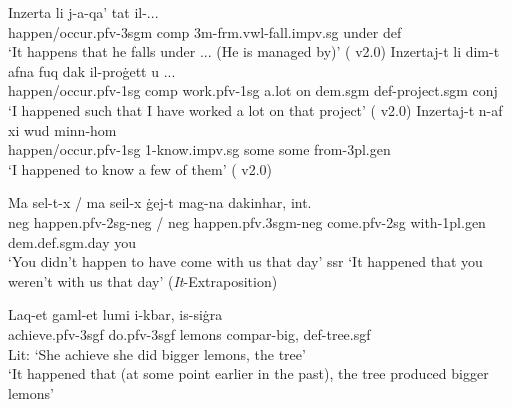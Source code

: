\documentclass[output=paper]{LSP/langsci}
\begin{document}
\ea \label{inzerta}
\ea \label{inzertaa}
\gll Inzerta li j-a-qa' ta\textcrh t il-...\\
happen/occur.{\sc pfv}-{\sc 3sgm} {\sc comp} 3{\sc m}-{\sc frm.vwl}-fall.{\sc impv.sg} under {\sc def}\\
\glt `It happens that he falls under ... (He is managed by)' \hfill{( v2.0)}
\ex \label{inzertali}
\gll Inzertaj-t li \textcrh dim-t \textcrh afna fuq dak il-pro{\.g}ett u ...\\
happen/occur.{\sc pfv}-{\sc 1sg} {\sc comp} work.{\sc pfv}-{\sc 1sg} a.lot on {\sc dem.sgm} {\sc def}-project.{\sc sgm} {\sc conj}\\
\glt `I happened such that I have worked a lot on that project' \hfill{( v2.0)}
\ex \label{inzertanoli}
\gll Inzertaj-t n-af xi w\textcrh ud minn-hom\\
happen/occur.{\sc pfv}-{\sc 1sg} 1-know.{\sc impv.sg} some some from-{\sc 3pl.gen}\\
\glt `I happened to know a few of them' \hfill{( v2.0)}
\z
\z

\ea \label{sehel}
\gll Ma s\textcrh el-t-x / ma se\textcrh il-x {\.{g}}ej-t mag\textcrh-na dakinhar, int.\\
{\sc neg} happen.{\sc pfv-2sg-neg} / {\sc neg} happen.{\sc pfv.3sgm-neg} come.{\sc pfv-2sg} with-{\sc 1pl.gen} {\sc dem.def.sgm}.day you\\
\glt `You didn't happen to have come with us that day' \hfill{{\sc ssr}}
\glt `It happened that you weren't with us that day' \hfill{(\emph{It}-Extraposition)}
\z  

\ea \label{lahaq}
\gll La\textcrh q-et g\textcrh aml-et lumi i-kbar, is-si{\.g}ra\\
achieve.{\sc pfv-3sgf} do.{\sc pfv-3sgf} lemons {\sc compar}-big, {\sc def}-tree.{\sc sgf}\\
\glt Lit: `She achieve she did bigger lemons, the tree'\\
\glt `It happened that (at some point earlier in the past), the tree produced bigger lemons'
\z


\end{document}
